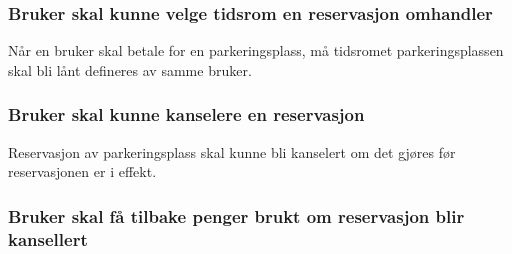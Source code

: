 \documentclass[12pt]{article}
\begin{document}
\subsubsection{Bruker skal kunne velge tidsrom en reservasjon omhandler}
Når en bruker skal betale for en parkeringsplass, må tidsromet parkeringsplassen skal bli lånt defineres av samme bruker.

\subsubsection{Bruker skal kunne kanselere en reservasjon}
Reservasjon av parkeringsplass skal kunne bli kanselert om det gjøres før reservasjonen er i effekt.

\subsubsection{Bruker skal få tilbake penger brukt om reservasjon blir kansellert}
\end{document}
